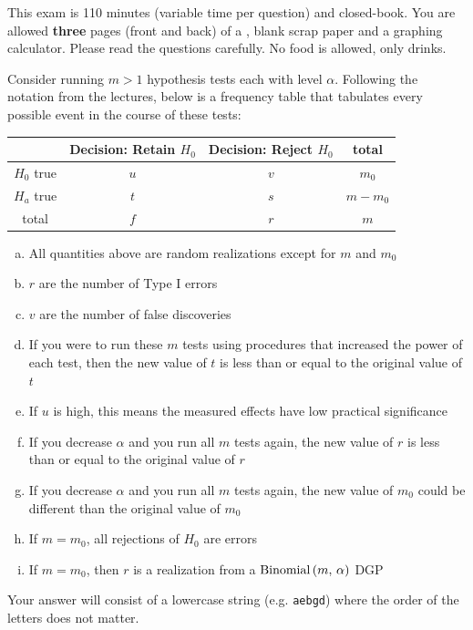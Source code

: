 \documentclass[12pt,landscape]{article}
\newcommand{\instr}{\small Your answer will consist of a lowercase string (e.g. \texttt{aebgd}) where the order of the letters does not matter. \normalsize}
\begin{document}
This exam is 110 minutes (variable time per question) and closed-book. You are allowed \textbf{three} pages (front and back) of a , blank scrap paper and a graphing calculator. Please read the questions carefully. No food is allowed, only drinks. %

\pagebreak

\problem{} Consider running $m > 1$ hypothesis tests each with level $\alpha$. Following the notation from the lectures, below is a frequency table that tabulates every possible event in the course of these tests:

\begin{table}[h]
\centering
\begin{tabular}{c|cc|c}
& Decision: Retain $H_0$ & Decision: Reject $H_0$ & total \\\hline
$H_0$ true & $u$ & $v$ & $m_0$ \\
$H_a$ true & $t$ & $s$ & $m - m_0$ \\ \hline
total & $f$ & $r$ & $m$
\end{tabular}
\end{table}
\FloatBarrier

\vspace{-0.2cm}\benum{} 

\begin{enumerate}[(a)]
\item All quantities above are random realizations except for $m$ and $m_0$
\item $r$ are the number of Type I errors
\item $v$ are the number of false discoveries
\item If you were to run these $m$ tests using procedures that increased the power of each test, then the new value of $t$ is less than or equal to the original value of $t$
\item If $u$ is high, this means the measured effects have low practical significance
\item If you decrease $\alpha$ and you run all $m$ tests again, the new value of $r$ is less than or equal to the original value of $r$
\item If you decrease $\alpha$ and you run all $m$ tests again, the new value of $m_0$ could be different than the original value of $m_0$
\item If $m=m_0$, all rejections of $H_0$ are errors
\item If $m=m_0$, then $r$ is a realization from a $\mathrm{Binomial}\left(m,\,\alpha\right)$ DGP
\end{enumerate}
\eenum\instr\pagebreak
\end{document}
